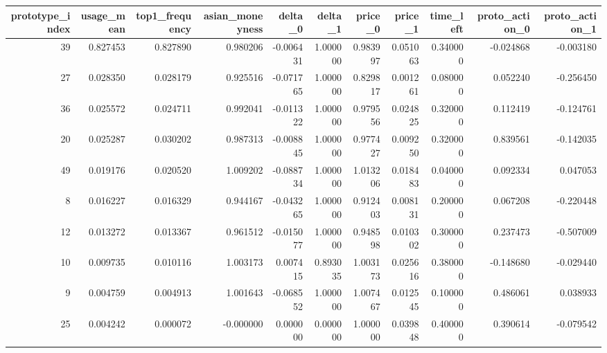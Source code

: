 \begin{tabular}{rrrrrrrrrrr}
\toprule
prototype\_index & usage\_mean & top1\_frequency & asian\_moneyness & delta\_0 & delta\_1 & price\_0 & price\_1 & time\_left & proto\_action\_0 & proto\_action\_1 \\
\midrule
39 & 0.827453 & 0.827890 & 0.980206 & -0.006431 & 1.000000 & 0.983997 & 0.051063 & 0.340000 & -0.024868 & -0.003180 \\
27 & 0.028350 & 0.028179 & 0.925516 & -0.071765 & 1.000000 & 0.829817 & 0.001261 & 0.080000 & 0.052240 & -0.256450 \\
36 & 0.025572 & 0.024711 & 0.992041 & -0.011322 & 1.000000 & 0.979556 & 0.024825 & 0.320000 & 0.112419 & -0.124761 \\
20 & 0.025287 & 0.030202 & 0.987313 & -0.008845 & 1.000000 & 0.977427 & 0.009250 & 0.320000 & 0.839561 & -0.142035 \\
49 & 0.019176 & 0.020520 & 1.009202 & -0.088734 & 1.000000 & 1.013206 & 0.018483 & 0.040000 & 0.092334 & 0.047053 \\
8 & 0.016227 & 0.016329 & 0.944167 & -0.043265 & 1.000000 & 0.912403 & 0.008131 & 0.200000 & 0.067208 & -0.220448 \\
12 & 0.013272 & 0.013367 & 0.961512 & -0.015077 & 1.000000 & 0.948598 & 0.010302 & 0.300000 & 0.237473 & -0.507009 \\
10 & 0.009735 & 0.010116 & 1.003173 & 0.007415 & 0.893035 & 1.003173 & 0.025616 & 0.380000 & -0.148680 & -0.029440 \\
9 & 0.004759 & 0.004913 & 1.001643 & -0.068552 & 1.000000 & 1.007467 & 0.012545 & 0.100000 & 0.486061 & 0.038933 \\
25 & 0.004242 & 0.000072 & -0.000000 & 0.000000 & 0.000000 & 1.000000 & 0.039848 & 0.400000 & 0.390614 & -0.079542 \\
\bottomrule
\end{tabular}
